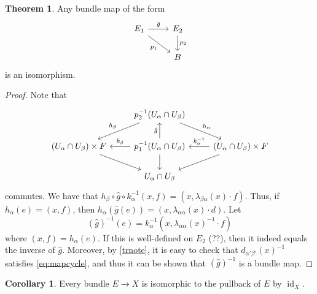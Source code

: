 \documentclass[10pt,letterpaper,cm]{nupset}
\theoremstyle{definition}
\theoremstyle{theorem}
\newtheorem{theorem}[defn]{Theorem}
\newtheorem{corollary}[defn]{Corollary}
\theoremstyle{remark}
\newcommand{\1}{\mathbb{1}}
\newcommand{\0}{\vec 0}
\DeclareMathOperator{\id}{id}
\begin{document}
\begin{theorem}
Any bundle map of the form
\[
\begin{tikzcd}
E_1 \arrow[rd, "p_1"'] \arrow[r, "\hat{g}"] & E_2 \arrow[d, "p_2"] \\
                                            & B                   
\end{tikzcd}
\]
is an isomorphism.
\end{theorem}
\begin{proof}
Note that
\[
\begin{tikzcd}
                                                         & p_2^{-1}(U_{\alpha}\cap U_{\beta}) \arrow[ld, "h_{\beta}"'] \arrow[rd, "h_{\alpha}"]      &                                                                                          \\
\left(U_{\alpha}\cap U_{\beta}\right)\times F \arrow[rd] & p_1^{-1}(U_{\alpha}\cap U_{\beta}) \arrow[u, "\hat{g}"] \arrow[d] \arrow[l, "k_{\beta}"'] & \left(U_{\alpha}\cap U_{\beta}\right)\times F \arrow[l, "k_{\alpha}^{-1}"'] \arrow[ld] \\
                                                         & U_{\alpha}\cap U_{\beta}                                                                    &                                                                                         
\end{tikzcd}
\] commutes.  We have that $h_{\beta} \circ \hat{g} \circ k_{\alpha}^{-1}(x,f) = \left(x, \lambda_{\beta{\alpha}}(x)\cdot f\right)$. Thus, if  $h_{\alpha}(e) = \left(x,f\right)$, then $h_{\alpha}\left(\hat{g}(e)\right) = \left(x, \lambda_{\alpha{\alpha}}(x) \cdot d\right).$ Let $$\left(\hat{g}\right)^{-1}(e) = k_{\alpha}^{-1}\left(x, \lambda_{\alpha{\alpha}}(x)^{-1}\cdot f\right)$$ where $\left(x,f\right) = h_{\alpha}(e)$. If this is well-defined on $E_2$ (??), then it indeed equals the inverse of $\hat{g}$.  Moreover, by \cref{trnote}, it is easy to check that $d_{\alpha'{\beta'}}(x)^{-1}$ satisfies \eqref{eq:mapcycle}, and thus it can be shown that $\left(\hat{g}\right)^{-1}$ is a bundle map.

\end{proof}

\begin{corollary}
Every bundle $E\to X$ is isomorphic to the pullback of $E$ by $\id_X$.
\end{corollary}
\end{document}
